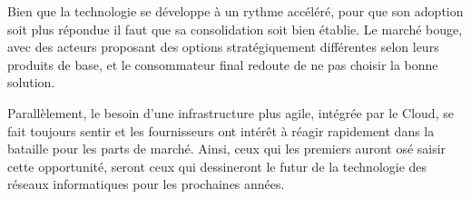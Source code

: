 Bien que la technologie se développe à un rythme accéléré, pour que son adoption soit plus répondue il faut que sa consolidation soit bien établie. Le marché bouge, avec des acteurs proposant des options stratégiquement différentes selon leurs produits de base, et le consommateur final redoute de ne pas choisir la bonne solution.

Parallèlement, le besoin d'une infrastructure plus agile, intégrée par le Cloud, se fait toujours sentir et les fournisseurs ont intérêt à réagir rapidement dans la bataille pour les parts de marché. Ainsi, ceux qui les premiers auront osé saisir cette opportunité, seront ceux qui dessineront le futur de la technologie des réseaux informatiques pour les prochaines années.

